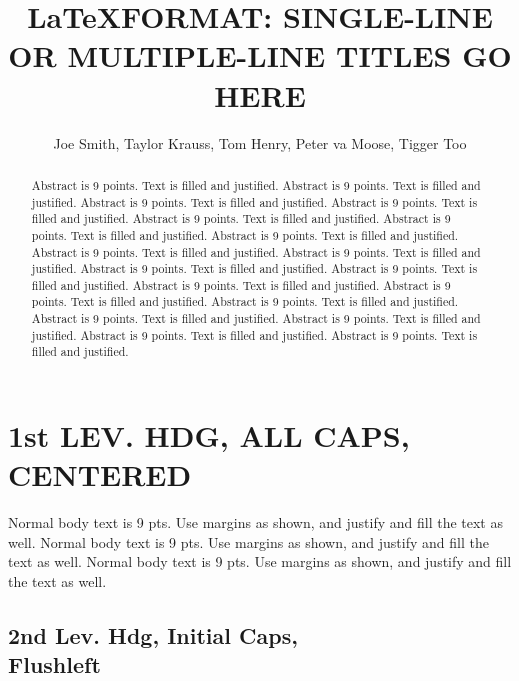 

\ninept

\title{\LaTeX  FORMAT: SINGLE-LINE\\
OR MULTIPLE-LINE TITLES GO HERE}

\author{Joe Smith, Taylor Krauss, Tom Henry, Peter va Moose,  Tigger Too}



\maketitle

\begin{abstract}

Abstract is 9 points. Text is filled and justified. Abstract is 9 points. Text is filled and justified. Abstract is 9 points. Text is filled and justified. Abstract is 9 points. Text is filled and justified. Abstract is 9 points. Text is filled and justified. Abstract is 9 points. Text is filled and justified. Abstract is 9 points. Text is filled and justified. Abstract is 9 points. Text is filled and justified. Abstract is 9 points. Text is filled and justified. Abstract is 9 points. Text is filled and justified. Abstract is 9 points. Text is filled and justified. Abstract is 9 points. Text is filled and justified. Abstract is 9 points. Text is filled and justified. Abstract is 9 points. Text is filled and justified. Abstract is 9 points. Text is filled and justified. Abstract is 9 points. Text is filled and justified. Abstract is 9 points. Text is filled and justified. Abstract is 9 points. Text is filled and justified. 
\end{abstract}

\section{1st LEV. HDG, ALL CAPS,\\ CENTERED}
Normal body text is 9 pts. Use margins as shown, and justify and fill the text as well.   Normal body text is 9 pts. Use margins as shown, and justify and fill the text as well.   Normal body text is 9 pts. Use margins as shown, and justify and fill the text as well.  

\subsection{2nd Lev. Hdg, Initial Caps,\\ Flushleft}

